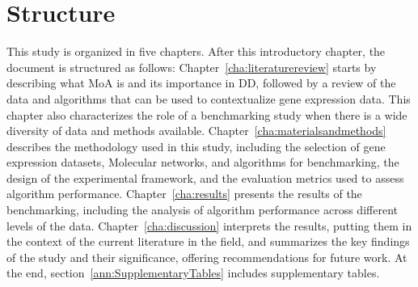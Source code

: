 \section{Structure} %
\label{sec:structure}

This study is organized in five chapters.
After this introductory chapter, the document is structured as follows: Chapter~\ref{cha:literaturereview} starts by describing what \gls{MoA} is and its importance in \gls{DD}, followed by a review of the data and algorithms that can be used to contextualize gene expression data. This chapter also characterizes the role of a benchmarking study when there is a wide diversity of data and methods available. 
Chapter~\ref{cha:materialsandmethods} describes the methodology used in this study, including the selection of gene expression datasets, \gls{Molecular network}s, and algorithms for benchmarking, the design of the experimental framework, and the evaluation metrics used to assess algorithm performance.
Chapter~\ref{cha:results} presents the results of the benchmarking, including the analysis of algorithm performance across different levels of the data.
Chapter~\ref{cha:discussion} interprets the results, putting them in the context of the current literature in the field, and summarizes the key findings of the study and their significance, offering recommendations for future work.
At the end, section~\ref{ann:SupplementaryTables} includes supplementary tables.